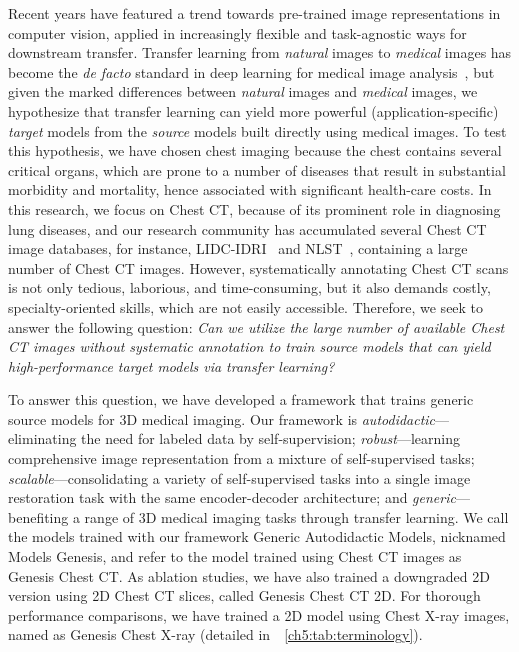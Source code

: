 Recent years have featured a trend towards pre-trained image representations in computer vision, applied in increasingly flexible and task-agnostic ways for downstream transfer.
Transfer learning from {\em natural} images to {\em medical} images has become the \textit{de facto} standard in deep learning for medical image analysis~\citep{tajbakhsh2016convolutional,shin2016deep}, but given the marked differences between {\em natural} images and {\em medical} images, we hypothesize that transfer learning can yield more powerful (application-specific) {\em target} models from the {\em source} models built directly using medical images. To test this hypothesis, we have chosen chest imaging because the chest contains several critical organs, which are prone to a number of diseases that result in substantial morbidity and mortality, hence associated with significant health-care costs. In this research, we focus on Chest CT, because of its prominent role in diagnosing lung diseases, and our research community has accumulated several Chest CT image databases, for instance, LIDC-IDRI~\citep{armato2011lung} and NLST~\citep{national2011reduced}, containing a large number of Chest CT images. However, systematically annotating Chest CT scans is not only tedious, laborious, and time-consuming, but it also demands costly, specialty-oriented skills, which are not easily accessible. Therefore, we seek to answer the following question: {\em Can we utilize the large number of available Chest CT images without systematic annotation to train source models that can yield high-performance target models via transfer learning?} 

To answer this question, we have developed a framework that trains generic source models for 3D medical imaging. Our framework is {\em autodidactic}---eliminating the need for labeled data by self-supervision; {\em robust}---learning comprehensive image representation from a mixture of self-supervised tasks; {\em scalable}---consolidating a variety of self-supervised tasks into a single image restoration task with the same encoder-decoder architecture; and {\em generic}---benefiting a range of 3D medical imaging tasks through transfer learning.
We call the models trained with our framework Generic Autodidactic Models, nicknamed Models Genesis, and refer to the model trained using Chest CT images as Genesis Chest CT.
As ablation studies, we have also trained a downgraded 2D version using 2D Chest CT slices, called Genesis Chest CT 2D. For thorough performance comparisons, we have trained a 2D model using Chest X-ray images, named as Genesis Chest X-ray (detailed in~\tablename~\ref{ch5:tab:terminology}). 

